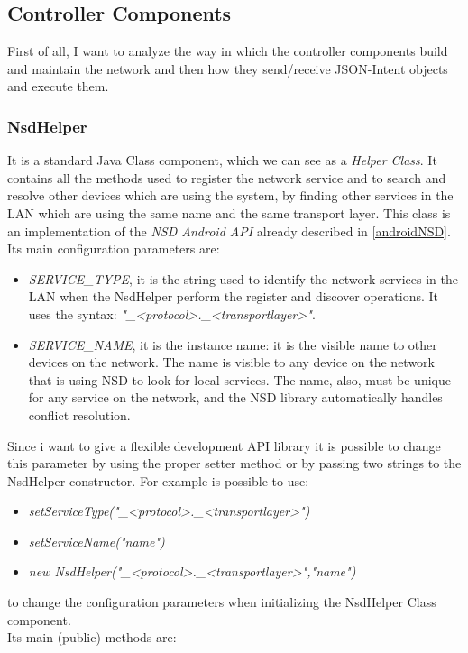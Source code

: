 \subsection{Controller Components}
First of all, I want to analyze the way in which the controller components build and maintain the network and then how they send/receive JSON-Intent objects and execute them.\\
\subsubsection{NsdHelper}
It is a standard Java Class component, which we can see as a \textit{Helper Class}. It contains all the methods used to register the network service and to search and resolve other devices which are using the system, by finding other services in the LAN which are using the same name and the same transport layer. This class is an implementation of the \textit{NSD Android API} already described in \ref{androidNSD}.
Its main configuration parameters are:
\begin{itemize}
	\item \textit{SERVICE\_TYPE}, it is the string used to identify the network services in the LAN when the NsdHelper perform the register and discover operations. It uses the syntax: \textit{"\_<protocol>.\_<transportlayer>"}. 
	\item \textit{SERVICE\_NAME}, it is the instance name: it is the visible name to other devices on the network. The name is visible to any device on the network that is using NSD to look for local services. The name, also, must be unique for any service on the network, and the NSD library automatically handles conflict resolution.
\end{itemize}
 Since i want to give a flexible development API library it is possible to change this parameter by using the proper setter method or by passing two strings to the NsdHelper constructor. For example is possible to use:
 \begin{itemize}
 	\item \textit{setServiceType("\_<protocol>.\_<transportlayer>")}
 	\item \textit{setServiceName("name")}
 	\item \textit{new NsdHelper("\_<protocol>.\_<transportlayer>","name")} 
 \end{itemize} to change the configuration parameters when initializing the NsdHelper Class component.\\
Its main (public) methods are:
